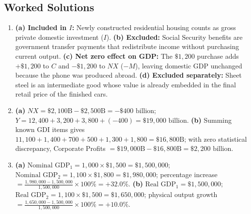 \documentclass[11pt,letterpaper]{article}
\begin{document}
\subsection*{Worked Solutions}
\begin{enumerate}
    \item \textbf{(a) Included in $I$:} Newly constructed residential housing counts as gross private domestic investment ($I$). \textbf{(b) Excluded:} Social Security benefits are government transfer payments that redistribute income without purchasing current output. \textbf{(c) Net zero effect on GDP:} The $\$1{,}200$ purchase adds $+\$1{,}200$ to $C$ and $-\$1{,}200$ to $NX$ ($-M$), leaving domestic GDP unchanged because the phone was produced abroad. \textbf{(d) Excluded separately:} Sheet steel is an intermediate good whose value is already embedded in the final retail price of the finished cars.
    \item \textbf{(a)} $NX = \$2{,}100\text{B} - \$2{,}500\text{B} = -\$400\text{ billion}$; $Y = 12{,}400 + 3{,}200 + 3{,}800 + (-400) = \$19{,}000\text{ billion}$. \textbf{(b)} Summing known GDI items gives $11{,}100 + 1{,}400 + 700 + 500 + 1{,}300 + 1{,}800 = \$16{,}800\text{B}$; with zero statistical discrepancy, Corporate Profits $= \$19{,}000\text{B} - \$16{,}800\text{B} = \$2{,}200\text{ billion}$.
    \item \textbf{(a)} $\text{Nominal GDP}_1 = 1{,}000 \times \$1{,}500 = \$1{,}500{,}000$; $\text{Nominal GDP}_2 = 1{,}100 \times \$1{,}800 = \$1{,}980{,}000$; percentage increase $= \frac{1{,}980{,}000 - 1{,}500{,}000}{1{,}500{,}000} \times 100\% = +32.0\%$. \textbf{(b)} $\text{Real GDP}_1 = \$1{,}500{,}000$; $\text{Real GDP}_2 = 1{,}100 \times \$1{,}500 = \$1{,}650{,}000$; physical output growth $= \frac{1{,}650{,}000 - 1{,}500{,}000}{1{,}500{,}000} \times 100\% = +10.0\%$.
\end{enumerate}
\end{document}
